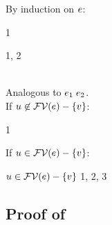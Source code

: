By induction on $e$:
\begin{bycase}
\Case{$\var$, $\opO$, $\descopO$, $\pjop{\fnam}$}
\begin{derivation}
\step{\cvarvO{\expr}=\emptyset}
     {}
\step{\varI\not\in\cvarvO{\expr}}
     {1}
\end{derivation}
\Case{$\appO$}
\begin{derivation}
     {}
     {\indhyp}
\step{\varI\not\in\cvarvO{\appO}}
     {1, 2}
\end{derivation}
\Case{$\eqO$, $\iifO$}\\
Analogous to $\appO$.
\Case{$\absO$}\\
\noindent
If $u\not\in\mathcal{FV}(e)-\{v\}$:
\begin{derivation}
\step{\cvarvO{\absO}=\emptyset}
     {}
\step{\varI\not\in\cvarvO{\absO}}
     {1}
\end{derivation}
\noindent
If $u\in\mathcal{FV}(e)-\{v\}$:
\begin{derivation}
\step{\cvarvO{\absO}=\setI{\var}\cup\cvarvO{\expr}}
     {}
\step{\varI\not\in\cvarvO{\expr}}
     {\indhyp}
\step{\varI\neq\var}
     {$u\in\mathcal{FV}(e)-\{v\}$}
\step{\varI\not\in\cvarvO{\absO}}
     {1, 2, 3}
\end{derivation}
\end{bycase}



\subsection*{Proof of }

